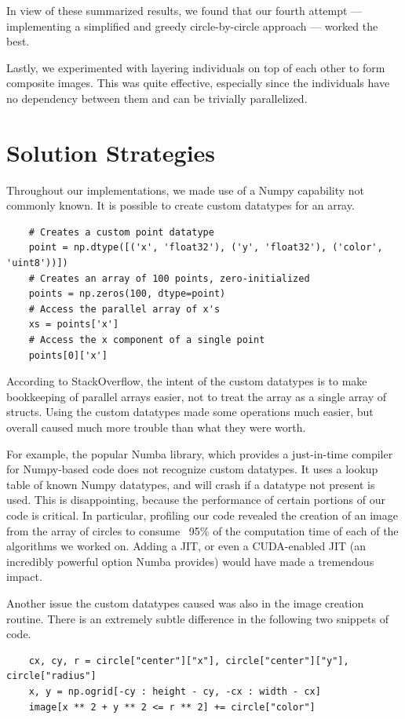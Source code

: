 \documentclass{article}
\begin{document}
In view of these summarized results, we found that our fourth attempt --- implementing a
simplified and greedy circle-by-circle approach --- worked the best.

Lastly, we experimented with layering individuals on top of each other to form composite
images. This was quite effective, especially since the individuals have no dependency between them
and can be trivially parallelized.

\section{Solution Strategies}\label{sec:strategies}

Throughout our implementations, we made use of a Numpy capability not commonly known. It is
possible to create custom datatypes for an array.

\begin{verbatim}
    # Creates a custom point datatype
    point = np.dtype([('x', 'float32'), ('y', 'float32'), ('color', 'uint8'))])
    # Creates an array of 100 points, zero-initialized
    points = np.zeros(100, dtype=point)
    # Access the parallel array of x's
    xs = points['x']
    # Access the x component of a single point
    points[0]['x']
\end{verbatim}

According to StackOverflow, the intent of the custom datatypes is to make bookkeeping of parallel
arrays easier, not to treat the array as a single array of structs. Using the custom datatypes made
some operations much easier, but overall caused much more trouble than what they were worth.

For example, the popular Numba library, which provides a just-in-time compiler for Numpy-based code
does not recognize custom datatypes. It uses a lookup table of known Numpy datatypes, and will
crash if a datatype not present is used. This is disappointing, because the performance of certain
portions of our code is critical. In particular, profiling our code revealed the creation of an
image from the array of circles to consume ~95\% of the computation time of each of the algorithms
we worked on. Adding a JIT, or even a CUDA-enabled JIT (an incredibly powerful option Numba
provides) would have made a tremendous impact.

Another issue the custom datatypes caused was also in the image creation routine. There is an
extremely subtle difference in the following two snippets of code.

\begin{verbatim}
    cx, cy, r = circle["center"]["x"], circle["center"]["y"], circle["radius"]
    x, y = np.ogrid[-cy : height - cy, -cx : width - cx]
    image[x ** 2 + y ** 2 <= r ** 2] += circle["color"]
\end{verbatim}
\end{document}
